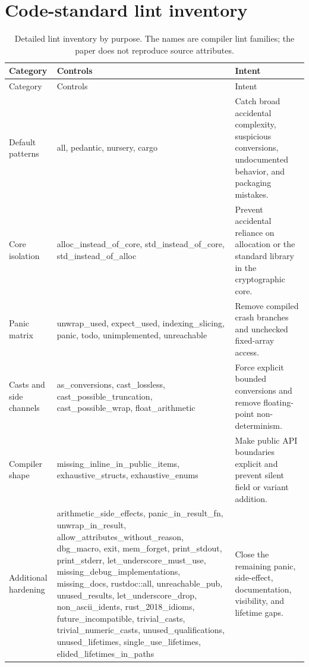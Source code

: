 \documentclass[11pt,a4paper]{article}
\begin{document}
\section{Code-standard lint inventory}

\begin{longtable}{@{}>{\raggedright\arraybackslash}p{3.4cm}>{\raggedright\arraybackslash}p{8.0cm}>{\raggedright\arraybackslash}p{3.4cm}@{}}
\caption{Detailed lint inventory by purpose. The names are compiler lint
families; the paper does not reproduce source attributes.}\\
\toprule
Category & Controls & Intent\\
\midrule
\endfirsthead
\toprule
Category & Controls & Intent\\
\midrule
\endhead
Default patterns & all, pedantic, nursery, cargo & Catch broad accidental complexity, suspicious conversions, undocumented behavior, and packaging mistakes.\\
Core isolation & alloc\_instead\_of\_core, std\_instead\_of\_core, std\_instead\_of\_alloc & Prevent accidental reliance on allocation or the standard library in the cryptographic core.\\
Panic matrix & unwrap\_used, expect\_used, indexing\_slicing, panic, todo, unimplemented, unreachable & Remove compiled crash branches and unchecked fixed-array access.\\
Casts and side channels & as\_conversions, cast\_lossless, cast\_possible\_truncation, cast\_possible\_wrap, float\_arithmetic & Force explicit bounded conversions and remove floating-point non-determinism.\\
Compiler shape & missing\_inline\_in\_public\_items, exhaustive\_structs, exhaustive\_enums & Make public API boundaries explicit and prevent silent field or variant addition.\\
Additional hardening & arithmetic\_side\_effects, panic\_in\_result\_fn, unwrap\_in\_result, allow\_attributes\_without\_reason, dbg\_macro, exit, mem\_forget, print\_stdout, print\_stderr, let\_underscore\_must\_use, missing\_debug\_implementations, missing\_docs, rustdoc::all, unreachable\_pub, unused\_results, let\_underscore\_drop, non\_ascii\_idents, rust\_2018\_idioms, future\_incompatible, trivial\_casts, trivial\_numeric\_casts, unused\_qualifications, unused\_lifetimes, single\_use\_lifetimes, elided\_lifetimes\_in\_paths & Close the remaining panic, side-effect, documentation, visibility, and lifetime gaps.\\
\bottomrule
\end{longtable}
\end{document}
